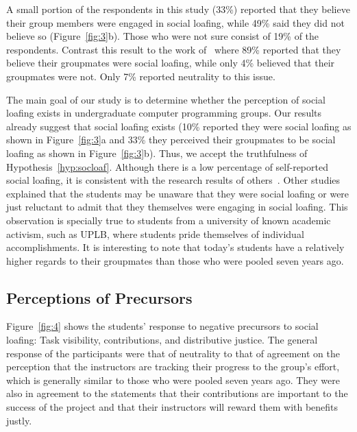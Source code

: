 \documentclass[a4paper,a4paper,BCOR12mm,12pt,abstracton,pointednumbers,tablecaptionabove,footinclude,halfparskip,normalheadings,]{scrartcl}
\begin{document}
A small portion of the respondents in this study (33\%) reported that they believe their group members were engaged in social loafing, while 49\% said they did not believe so (Figure~\ref{fig:3}b). Those who were not sure consist of 19\% of the respondents. Contrast this result to the work of~\citet{Pabico08} where 89\% reported that they believe their groupmates were social loafing, while only 4\% believed that their groupmates were not. Only 7\% reported neutrality to this issue.

The main goal of our study is to determine whether the perception of social loafing exists in undergraduate computer programming groups. Our results already suggest that social loafing exists (10\% reported they were social loafing as shown in Figure~\ref{fig:3}a and 33\% they perceived their groupmates to be social loafing as shown in Figure~\ref{fig:3}b). Thus, we accept the truthfulness of Hypothesis~\ref{hyp:socloaf}. Although there is a low percentage of self-reported social loafing, it is consistent with the research results of others~\citep{Karau93}. Other studies explained that the students may be unaware that they were social loafing or were just reluctant to admit that they themselves were engaging in social loafing. This observation is specially true to students from a university of known academic activism, such as UPLB, where students pride themselves of individual accomplishments. It is interesting to note that today's students have a relatively higher regards to their groupmates than those who were pooled seven years ago.

\subsection{Perceptions of Precursors}

Figure~\ref{fig:4} shows the students' response to negative precursors to social loafing: Task visibility, contributions, and distributive justice. The general response of the participants were that of neutrality to that of agreement on the perception that the instructors are tracking their progress to the group's effort, which is generally similar to those who were pooled seven years ago. They were also in agreement to the statements that their contributions are important to the success of the project and that their instructors will reward them with benefits justly.

\begin{figure*}[hbt]
\centering{}
\caption{The respondents agreement to negative precursors to social loafing: (a)~Task visibility, (b)~contributions, and (c)~distributive justice. The data from seven years ago came from~\citet{Pabico08}.}\label{fig:4}
\end{figure*}
\end{document}
